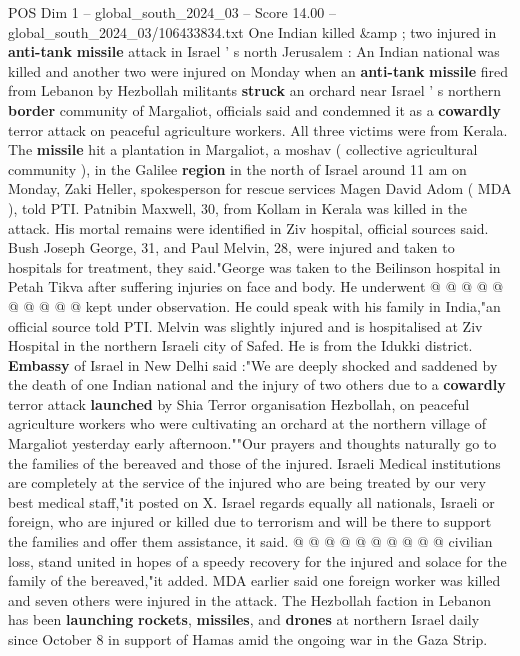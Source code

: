 \begin{textsample}{POS Dim 1 – global\_south\_2024\_03 – Score 14.00 – global\_south\_2024\_03/106433834.txt}  \label{ex:f1_pos_343}
One Indian killed \&amp ; two injured in \textbf{anti-tank} \textbf{missile} attack in Israel ' s north Jerusalem : An Indian national was killed and another two were injured on Monday when an \textbf{anti-tank} \textbf{missile} fired from Lebanon by Hezbollah militants \textbf{struck} an orchard near Israel ' s northern \textbf{border} community of Margaliot, officials said and condemned it as a \textbf{cowardly} terror attack on peaceful agriculture workers.
All three victims were from Kerala.
The \textbf{missile} hit a plantation in Margaliot, a moshav ( collective agricultural community ), in the Galilee \textbf{region} in the north of Israel around 11 am on Monday, Zaki Heller, spokesperson for rescue services Magen David Adom ( MDA ), told PTI.
Patnibin Maxwell, 30, from Kollam in Kerala was killed in the attack.
His mortal remains were identified in Ziv hospital, official sources said.
Bush Joseph George, 31, and Paul Melvin, 28, were injured and taken to hospitals for treatment, they said."George was taken to the Beilinson hospital in Petah Tikva after suffering injuries on face and body.
He underwent @ @ @ @ @ @ @ @ @ @ kept under observation.
He could speak with his family in India,"an official source told PTI.
Melvin was slightly injured and is hospitalised at Ziv Hospital in the northern Israeli city of Safed.
He is from the Idukki district. \textbf{Embassy} of Israel in New Delhi said :"We are deeply shocked and saddened by the death of one Indian national and the injury of two others due to a \textbf{cowardly} terror attack \textbf{launched} by Shia Terror organisation Hezbollah, on peaceful agriculture workers who were cultivating an orchard at the northern village of Margaliot yesterday early afternoon.""Our prayers and thoughts naturally go to the families of the bereaved and those of the injured.
Israeli Medical institutions are completely at the service of the injured who are being treated by our very best medical staff,"it posted on X.
Israel regards equally all nationals, Israeli or foreign, who are injured or killed due to terrorism and will be there to support the families and offer them assistance, it said. @ @ @ @ @ @ @ @ @ @ civilian loss, stand united in hopes of a speedy recovery for the injured and solace for the family of the bereaved,"it added.
MDA earlier said one foreign worker was killed and seven others were injured in the attack.
The Hezbollah faction in Lebanon has been \textbf{launching} \textbf{rockets}, \textbf{missiles}, and \textbf{drones} at northern Israel daily since October 8 in support of Hamas amid the ongoing war in the Gaza Strip.

\end{textsample}
